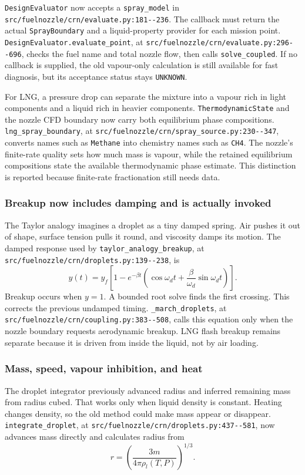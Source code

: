 \documentclass[11pt]{article}
\newcommand{\code}[1]{\nolinkurl{#1}}
\newcommand{\srcline}[2]{\nolinkurl{#1:#2}}
\begin{document}
\code{DesignEvaluator} now accepts a \code{spray_model} in
\srcline{src/fuelnozzle/crn/evaluate.py}{181--236}. The callback must return the actual
\code{SprayBoundary} and a liquid-property provider for each mission point.
\code{DesignEvaluator.evaluate_point}, at
\srcline{src/fuelnozzle/crn/evaluate.py}{296--696}, checks the fuel name and total nozzle flow,
then calls \code{solve_coupled}. If no callback is supplied, the old vapour-only calculation is
still available for fast diagnosis, but its acceptance status stays \code{UNKNOWN}.

For LNG, a pressure drop can separate the mixture into a vapour rich in light components and a
liquid rich in heavier components. \code{ThermodynamicState} and the nozzle CFD boundary now
carry both equilibrium phase compositions. \code{lng_spray_boundary}, at
\srcline{src/fuelnozzle/crn/spray_source.py}{230--347}, converts names such as
\code{Methane} into chemistry names such as \code{CH4}. The nozzle's finite-rate quality sets
how much mass is vapour, while the retained equilibrium compositions state the available
thermodynamic phase estimate. This distinction is reported because finite-rate fractionation
still needs data.

\subsubsection{Breakup now includes damping and is actually invoked}

The Taylor analogy imagines a droplet as a tiny damped spring. Air pushes it out of shape,
surface tension pulls it round, and viscosity damps its motion. The damped response used by
\code{taylor_analogy_breakup}, at
\srcline{src/fuelnozzle/crn/droplets.py}{139--238}, is
\[
 y(t)=y_f\left[1-e^{-\beta t}
 \left(\cos\omega_d t+\frac{\beta}{\omega_d}\sin\omega_d t\right)\right].
\]
Breakup occurs when $y=1$. A bounded root solve finds the first crossing. This corrects the
previous undamped timing. \code{\_march_droplets}, at
\srcline{src/fuelnozzle/crn/coupling.py}{383--508}, calls this equation only when the nozzle
boundary requests aerodynamic breakup. LNG flash breakup remains separate because it is driven
from inside the liquid, not by air loading.

\subsubsection{Mass, speed, vapour inhibition, and heat}

The droplet integrator previously advanced radius and inferred remaining mass from radius
cubed. That works only when liquid density is constant. Heating changes density, so the old
method could make mass appear or disappear. \code{integrate_droplet}, at
\srcline{src/fuelnozzle/crn/droplets.py}{437--581}, now advances mass directly and calculates
radius from
\[
 r=\left(\frac{3m}{4\pi\rho_l(T,P)}\right)^{1/3}.
\]
\end{document}
